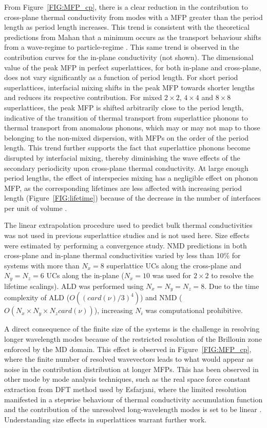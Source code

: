 \documentclass[aps,prb,preprint,preprintnumbers,amsmath,amssymb,floatfix,superscriptaddress]{revtex4}
\begin{document}
From Figure~\ref{FIG:MFP_cp}, there is a clear reduction in the contribution to cross-plane thermal conductivity from modes with a MFP greater than the period length as period length increases. This trend is consistent with the theoretical predictions from Mahan that a minimum occurs as the transport behaviour shifts from a wave-regime to particle-regime \cite{PhysRevLett.84.927,PhysRevB.56.10754}. This same trend is observed in the contribution curves for the in-plane conductivity (not shown). The dimensional value of the peak MFP in perfect superlattices, for both in-plane and cross-plane, does not vary significantly as a function of period length. For short period superlattices, interfacial mixing shifts in the peak MFP towards shorter lengths and reduces its respective contribution. For mixed $2\times2$, $4\times4$ and $8\times8$ superlattices, the peak MFP is shifted arbitrarily close to the period length, indicative of the transition of thermal transport from superlattice phonons to thermal transport from anomalous phonons, which may or may not map to those belonging to the non-mixed dispersion, with MFPs on the order of the period length. This trend further supports the fact that superlattice phonons become disrupted by interfacial mixing, thereby diminishing the wave effects of the secondary periodicity upon cross-plane thermal conductivity. At large enough period lengths, the effect of interspecies mixing has a negligible effect on phonon MFP, as the corresponding lifetimes are less affected with increasing period length (Figure~\ref{FIG:lifetime}) because of the decrease in the number of interfaces per unit of volume \cite{PhysRevB.79.075316}.

The linear extrapolation procedure used to predict bulk thermal conductivities \cite{PhysRevB.81.214305} was not used in previous superlattice studies \cite{doi:10.1021/nl202186y,Luckyanova16112012} and is not used here. Size effects were estimated by performing a convergence study. NMD predictions in both cross-plane and in-plane thermal conductivities varied by less than 10\% for systems with more than $N_x=8$ superlattice UCs along the cross-plane and $N_y=N_z=6$ UCs along the in-plane ($N_x=10$ was used for $2\times2$ to resolve the lifetime scalings). ALD was performed using $N_x=N_y=N_z=8$. Due to the time complexity of ALD ($O((card(\nu)/3)^4)$) and NMD ($O(N_x \times N_y \times N_z card(\nu))$), increasing $N_i$ was computational prohibitive.

A direct consequence of the finite size of the systems is the challenge in resolving longer wavelength modes because of the restricted resolution of the Brillouin zone enforced by the MD domain. This effect is observed in Figure~\ref{FIG:MFP_cp}, where the finite number of resolved wavevectors leads to what would appear as noise in the contribution distribution at longer MFPs. This has been observed in other mode by mode analysis techniques, such as the real space force constant extraction from DFT method used by Esfarjani, where the limited resolution manifested in a stepwise behaviour of thermal conductivity accumulation function and the contribution of the unresolved long-wavelength modes is set to be linear \cite{PhysRevB.84.085204}. Understanding size effects in superlattices warrant further work.
\end{document}
